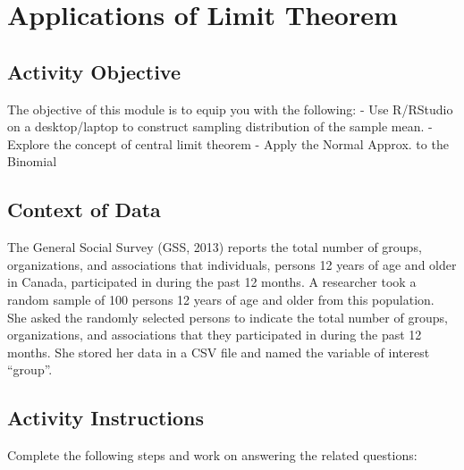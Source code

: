 \documentclass[oneside,openany]{book}
\begin{document}
\chapter{Applications of Limit Theorem}\label{activity-4---applications-of-limit-theorem}

\section{Activity Objective}\label{activity-objective-1}

The objective of this module is to equip you with the following:
- Use R/RStudio on a desktop/laptop to construct sampling distribution of the sample mean.
- Explore the concept of central limit theorem
- Apply the Normal Approx. to the Binomial

\section{Context of Data}\label{context-of-data}

The General Social Survey (GSS, 2013) reports the total number of groups, organizations, and associations that individuals, persons 12 years of age and older in Canada, participated in during the past 12 months. A researcher took a random sample of 100 persons 12 years of age and older from this population. She asked the randomly selected persons to indicate the total number of groups, organizations, and associations that they participated in during the past 12 months. She stored her data in a CSV file and named the variable of interest ``group''.

\section{Activity Instructions}\label{activity-instructions}

Complete the following steps and work on answering the related questions:
\end{document}
